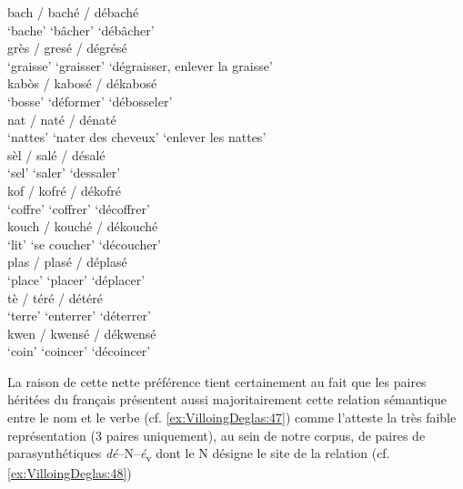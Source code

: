 \documentclass[output=paper]{langsci/langscibook}
\begin{document}
\ea \label{ex:VilloingDeglas:45}
      \ea \gll bach / baché / débaché \\
        {`bache'} {} {`bâcher'} {} {`débâcher'}\\
      \ex \gll  grès / gresé / dégrésé \\
        {`graisse'} {} {`graisser'} {} {`dégraisser, enlever la graisse'}\\
      \ex \gll  kabòs / kabosé / dékabosé \\
        {`bosse'} {} {`déformer'} {} {`débosseler'}\\
      \ex \gll  nat / naté / dénaté \\
        {`nattes'} {} {`nater des cheveux'} {} {`enlever les nattes'}\\
      \ex \gll  sèl / salé / désalé \\
        {`sel'} {} {`saler'} {} {`dessaler'}\\
      \z
\ex \label{ex:VilloingDeglas:46}
      \ea \gll kof / kofré / dékofré \\
        {`coffre'} {} {`coffrer'} {} {`décoffrer'}\\
      \ex \gll  kouch / kouché / dékouché \\
        {`lit'} {} {`se coucher'} {} {`découcher'}\\
      \ex \gll  plas / plasé / déplasé \\
        {`place'} {} {`placer'} {} {`déplacer'}\\
      \ex \gll  tè / téré / détéré \\
        {`terre'} {} {`enterrer'} {} {`déterrer'}\\
      \ex \gll  kwen / kwensé / dékwensé \\
        {`coin'} {} {`coincer'} {} {`décoincer'}\\
\z\z


La raison de cette nette préférence tient certainement au fait que les
paires héritées du français présentent aussi majoritairement cette
relation sémantique entre le nom et le verbe (cf. \ref{ex:VilloingDeglas:47}) comme l'atteste la
très faible représentation (3 paires uniquement), au sein de notre
corpus, de paires de parasynthétiques \emph{dé}--N--\emph{é}\textsubscript{v} dont le N
désigne le site de la relation (cf. \ref{ex:VilloingDeglas:48})
\end{document}
